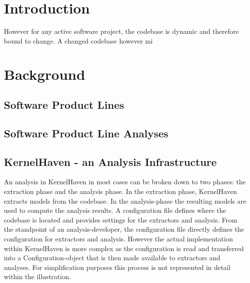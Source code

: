 \documentclass[a4paper]{article}
\begin{document}
\newpage
\lhead{{}}
\rhead{\leftmark}
\pagestyle{fancy}

\listoftodos[Notes]
\clearpage

\tableofcontents
\newpage


\maketitle
\newpage

\setcounter{page}{1}
\lhead{{}}
\rhead{\leftmark}
\pagestyle{fancy}



\section{Introduction}

However for any active software project, the codebase is dynamic and therefore bound to change. A changed codebase however mi


\section{Background}
\subsection{Software Product Lines}

\subsection{Software Product Line Analyses}

\subsection{KernelHaven - an Analysis Infrastructure}\label{kernelhaven}

 An analysis in KernelHaven in most cases can be broken down to two phases: the extraction phase and the analysis phase. In the extraction phase, KernelHaven extracts models from the codebase. In the analysis-phase the resulting models are used to compute the analysis results. A configuration file defines where the codebase is located and provides settings for the extractors and analysis. From the standpoint of an analysis-developer, the configuration file directly defines the configuration for extractors and analysis. However the actual implementation within KernelHaven is more complex as the configuration is read and transferred into a Configuration-object that is then made available to extractors and analyses. For simplification purposes this process is not represented in detail within the illustration. 
\end{document}
